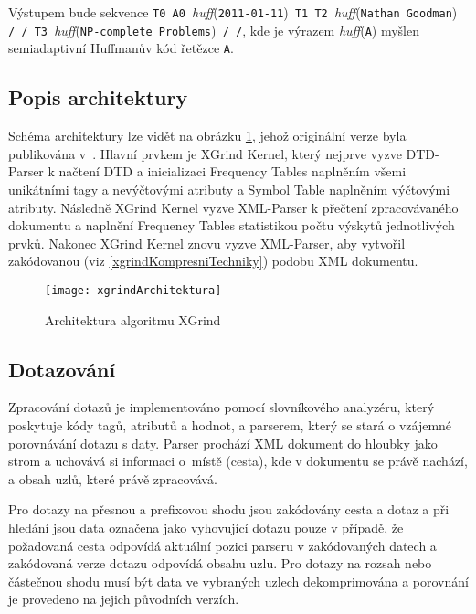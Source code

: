 Výstupem bude sekvence \texttt{T0 A0 }\textit{huff}(\texttt{2011-01-11})\texttt{ T1 T2 }\textit{huff}(\texttt{Nathan Goodman})\texttt{ / / T3 }\textit{huff}(\texttt{NP-complete Problems})\texttt{ / /}, kde je výrazem \textit{huff}(\texttt{A}) myšlen semiadaptivní Huffmanův kód řetězce \texttt{A}.

\subsection{Popis architektury}
Schéma architektury lze vidět na obrázku \ref{architekturaXGrind}, jehož originální verze byla publikována v~\cite{xgrind}. Hlavní prvkem je XGrind Kernel, který nejprve vyzve DTD-Parser k načtení DTD a inicializaci Frequency Tables naplněním všemi unikátními tagy a nevýčtovými atributy a Symbol Table naplněním výčtovými atributy. Následně XGrind Kernel vyzve \mbox{XML-Parser} k přečtení zpracovávaného dokumentu a naplnění Frequency Tables statistikou počtu výskytů jednotlivých prvků. Nakonec XGrind Kernel znovu vyzve XML-Parser, aby vytvořil zakódovanou (viz \ref{xgrindKompresniTechniky}) podobu XML dokumentu. \cite{xgrind}

\begin{figure}[!htb]
\centering
\texttt{[image: xgrindArchitektura]}
\caption{Architektura algoritmu XGrind}
\label{architekturaXGrind}
\end{figure}

\subsection{Dotazování}
Zpracování dotazů je implementováno pomocí slovníkového analyzéru, který poskytuje kódy tagů, atributů a hodnot, a parserem, který se stará o vzájemné porovnávání dotazu s daty. Parser prochází XML dokument do hloubky jako strom a uchovává si informaci o~místě (cesta), kde v dokumentu se právě nachází, a obsah uzlů, které právě zpracovává.

Pro dotazy na přesnou a prefixovou shodu jsou zakódovány cesta a dotaz a při hledání jsou data označena jako vyhovující dotazu pouze v případě, že požadovaná cesta odpovídá aktuální pozici parseru v zakódovaných datech a zakódovaná verze dotazu odpovídá obsahu uzlu. Pro dotazy na rozsah nebo částečnou shodu musí být data ve vybraných uzlech dekomprimována a porovnání je provedeno na jejich původních verzích. \cite{xgrind}
